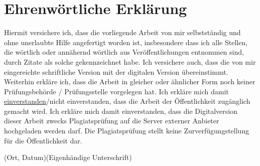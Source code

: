 \chapter*{Ehrenwörtliche Erklärung}

Hiermit versichere ich, dass die vorliegende Arbeit von mir selbstständig und ohne unerlaubte Hilfe angefertigt worden ist, insbesondere dass ich alle Stellen, die wörtlich oder annähernd wörtlich aus Veröffentlichungen entnommen sind, durch Zitate als solche gekennzeichnet habe. Ich versichere auch, dass die von mir eingereichte schriftliche Version mit der digitalen Version übereinstimmt. Weiterhin erkläre ich, dass die Arbeit in gleicher oder ähnlicher Form noch keiner Prüfungsbehörde / Prüfungsstelle vorgelegen hat. Ich erkläre mich damit \underline{einverstanden}/nicht einverstanden, dass die Arbeit der Öffentlichkeit zugänglich gemacht wird. Ich erkläre mich damit einverstanden, dass die Digitalversion dieser Arbeit zwecks Plagiatsprüfung auf die Server externer Anbieter hochgeladen werden darf. 
Die Plagiatsprüfung stellt keine Zurverfügungstellung für die Öffentlichkeit dar.



\vspace{2cm}

\noindent
(Ort, Datum)\hfill						(Eigenhändige Unterschrift)

